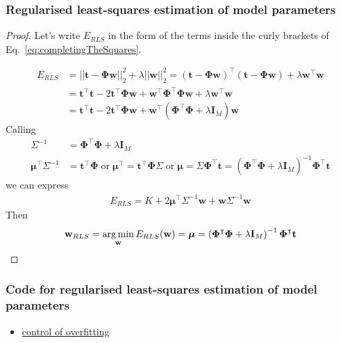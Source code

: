 \begin{frame}
    \frametitle{Regularised least-squares estimation of model parameters}
	\tiny
		\begin{proof}
			Let's write $E_{RLS}$ in the form of the terms inside the curly brackets of Eq.~\ref{eq:completingTheSquares}.

		\begin{align*}
			E_{RLS}&=||\mathbf{t}-\boldsymbol{\Phi}\mathbf{w}||_2^2+\lambda||\mathbf{w}||_2^2=(\mathbf{t}-\boldsymbol{\Phi}\mathbf{w})^\intercal(\mathbf{t}-\boldsymbol{\Phi}\mathbf{w})+\lambda\mathbf{w}^\intercal\mathbf{w}\\
                   &=\mathbf{t}^\intercal\mathbf{t}-2\mathbf{t}^\intercal\boldsymbol{\Phi}\mathbf{w}+\mathbf{w}^\intercal\boldsymbol{\Phi}^\intercal\boldsymbol{\Phi}\mathbf{w}+\lambda\mathbf{w}^\intercal\mathbf{w}\\
                   &=\mathbf{t}^\intercal\mathbf{t}-2\mathbf{t}^\intercal\boldsymbol{\Phi}\mathbf{w}+\mathbf{w}^\intercal(\boldsymbol{\Phi}^\intercal\boldsymbol{\Phi}+\lambda\mathbf{I}_M)\mathbf{w}
		\end{align*}
		Calling
		\begin{align*}
			\Sigma^{-1}&=\boldsymbol{\Phi}^\intercal\boldsymbol{\Phi}+\lambda\mathbf{I}_M\\
			\boldsymbol{\mu}^\intercal\Sigma^{-1}&=\mathbf{t}^\intercal\boldsymbol{\Phi}\;\text{or}\;\boldsymbol{\mu}^\intercal=\mathbf{t}^\intercal\boldsymbol{\Phi}\Sigma\;\text{or}\;\boldsymbol{\mu}=\Sigma\boldsymbol{\Phi}^\intercal\mathbf{t}=\left(\boldsymbol{\Phi}^\intercal\boldsymbol{\Phi}+\lambda\mathbf{I}_M\right)^{-1}\boldsymbol{\Phi}^\intercal\mathbf{t}
		\end{align*}
		we can express
		\begin{align*}
			E_{RLS}=K+2\boldsymbol{\mu}^\intercal\Sigma^{-1}\mathbf{w}+\mathbf{w}\Sigma^{-1}\mathbf{w}
		\end{align*}
		Then
		\begin{align*}
			 \mathbf{w}_{RLS}=\operatorname*{arg\,min}_{\mathbf{w}}E_{RLS}(\mathbf{w})=\boldsymbol{\mu}=\left(\boldsymbol{\Phi}^\intercal\boldsymbol{\Phi}+\lambda\mathbf{I}_M\right)^{-1}\boldsymbol{\Phi}^\intercal\mathbf{t} 
		\end{align*}
		\end{proof}
	\normalsize
\end{frame}

\begin{frame}
    \frametitle{Code for regularised least-squares estimation of model parameters}
    \begin{itemize}
        \item \href{https://github.com/joacorapela/gcnuBridging2023/blob/master/docs/sphinx/build/html/notebooks/auto_examples/bayesianLinearRegression/plotRegularizedLeastSquares.ipynb}{control of overfitting}
    \end{itemize}
\end{frame}

